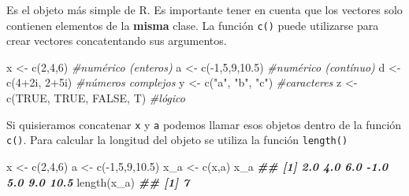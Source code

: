\documentclass[
]{book}
\newenvironment{Shaded}{\begin{snugshade}}{\end{snugshade}}
\newcommand{\CommentTok}[1]{\textcolor[rgb]{0.56,0.35,0.01}{\textit{#1}}}
\newcommand{\ConstantTok}[1]{\textcolor[rgb]{0.00,0.00,0.00}{#1}}
\newcommand{\DecValTok}[1]{\textcolor[rgb]{0.00,0.00,0.81}{#1}}
\newcommand{\DocumentationTok}[1]{\textcolor[rgb]{0.56,0.35,0.01}{\textbf{\textit{#1}}}}
\newcommand{\FloatTok}[1]{\textcolor[rgb]{0.00,0.00,0.81}{#1}}
\newcommand{\FunctionTok}[1]{\textcolor[rgb]{0.00,0.00,0.00}{#1}}
\newcommand{\NormalTok}[1]{#1}
\newcommand{\OtherTok}[1]{\textcolor[rgb]{0.56,0.35,0.01}{#1}}
\newcommand{\SpecialCharTok}[1]{\textcolor[rgb]{0.00,0.00,0.00}{#1}}
\newcommand{\StringTok}[1]{\textcolor[rgb]{0.31,0.60,0.02}{#1}}
\begin{document}
Es el objeto más simple de R. Es importante tener en cuenta que los vectores solo contienen elementos de la \textbf{misma} clase. La función \texttt{c()} puede utilizarse para crear vectores concatentando sus argumentos.

\begin{Shaded}
\begin{Highlighting}[]
\NormalTok{x }\OtherTok{\textless{}{-}} \FunctionTok{c}\NormalTok{(}\DecValTok{2}\NormalTok{,}\DecValTok{4}\NormalTok{,}\DecValTok{6}\NormalTok{)                 }\CommentTok{\#numérico (enteros) }
\NormalTok{a }\OtherTok{\textless{}{-}} \FunctionTok{c}\NormalTok{(}\SpecialCharTok{{-}}\DecValTok{1}\NormalTok{,}\DecValTok{5}\NormalTok{,}\DecValTok{9}\NormalTok{,}\FloatTok{10.5}\NormalTok{)           }\CommentTok{\#numérico (contínuo)}
\NormalTok{d }\OtherTok{\textless{}{-}} \FunctionTok{c}\NormalTok{(}\DecValTok{4}\SpecialCharTok{+}\NormalTok{2i, }\DecValTok{2}\SpecialCharTok{+}\NormalTok{5i)            }\CommentTok{\#números complejos}
\NormalTok{y }\OtherTok{\textless{}{-}} \FunctionTok{c}\NormalTok{(}\StringTok{"a"}\NormalTok{, }\StringTok{"b"}\NormalTok{, }\StringTok{"c"}\NormalTok{)         }\CommentTok{\#caracteres}
\NormalTok{z }\OtherTok{\textless{}{-}} \FunctionTok{c}\NormalTok{(}\ConstantTok{TRUE}\NormalTok{, }\ConstantTok{TRUE}\NormalTok{, }\ConstantTok{FALSE}\NormalTok{, T)  }\CommentTok{\#lógico}
\end{Highlighting}
\end{Shaded}

Si quisieramos concatenar \texttt{x} y \texttt{a} podemos llamar esos objetos dentro de la función \texttt{c()}. Para calcular la longitud del objeto se utiliza la función \texttt{length()}

\begin{Shaded}
\begin{Highlighting}[]
\NormalTok{x }\OtherTok{\textless{}{-}} \FunctionTok{c}\NormalTok{(}\DecValTok{2}\NormalTok{,}\DecValTok{4}\NormalTok{,}\DecValTok{6}\NormalTok{)             }
\NormalTok{a }\OtherTok{\textless{}{-}} \FunctionTok{c}\NormalTok{(}\SpecialCharTok{{-}}\DecValTok{1}\NormalTok{,}\DecValTok{5}\NormalTok{,}\DecValTok{9}\NormalTok{,}\FloatTok{10.5}\NormalTok{)       }
\NormalTok{x\_a }\OtherTok{\textless{}{-}} \FunctionTok{c}\NormalTok{(x,a)}
\NormalTok{x\_a}
\DocumentationTok{\#\# [1]  2.0  4.0  6.0 {-}1.0  5.0  9.0 10.5}
\FunctionTok{length}\NormalTok{(x\_a)}
\DocumentationTok{\#\# [1] 7}
\end{Highlighting}
\end{Shaded}
\end{document}
